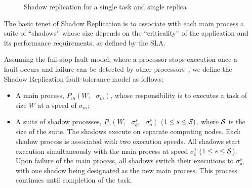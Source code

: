 \begin{figure}[!t]
	\begin{center}
	\end{center}
	\caption{Shadow replication for a single task and single replica}
	\label{fig:sc_overview}
\end{figure}


The basic tenet of Shadow Replication is to associate with each
main process a suite of ``shadows'' whose size depends on the
``criticality'' of the application and its performance requirements,
as defined by the SLA. 

Assuming the fail-stop fault model, where a processor stops execution once a fault
occurs and failure can be detected by other processors~\cite{gartner_faults_1999,cristian_comm_1991}, 
we define the Shadow Replication fault-tolerance model as follows:
\begin{itemize}
\item A main process, $P_m(W,\text{ }\sigma_m)$, whose responsibility is to executes a task of size $W$ at a speed of $\sigma_m$;
\item A suite of shadow processes, $P_{s}(W,\text{ }\sigma_b^s, \text{ }\sigma_a^s)$ ($1 \le s \le \cal S)$, where $\cal S$ is the size of the suite. The shadows execute on separate computing nodes. Each shadow process is associated with two execution speeds. All shadows start execution simultaneously with the main process at speed $\sigma_b^s$ ($1 \le s \le \cal S$). Upon failure of the main process, all shadows switch their executions to $\sigma_a^s$, with one shadow being designated as the new main process. This process continues until completion of the task.
\end{itemize}

